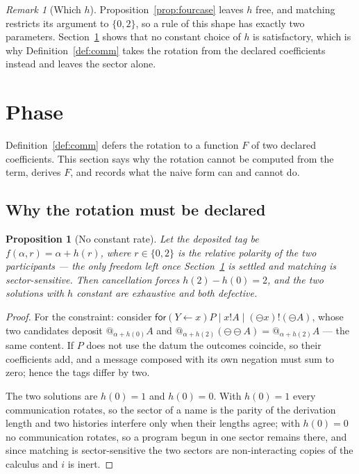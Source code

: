 \documentclass[11pt]{article}
\makeatletter
\newtheorem{proposition}[theorem]{Proposition}
\theoremstyle{definition}
\theoremstyle{remark}
\newtheorem{remark}[theorem]{Remark}
\newcommand{\quo}[1]{\ensuremath{@_{#1}}}
\newcommand{\negop}{\ensuremath{\ominus}}
\makeatother
\begin{document}
\begin{remark}[Which $h$]
\label{sec:fourcase}
Proposition~\ref{prop:fourcase} leaves $h$ free, and matching restricts its
argument to $\{0,2\}$, so a rule of this shape has exactly two parameters.
Section~\ref{sec:phase} shows that no constant choice of $h$ is satisfactory,
which is why Definition~\ref{def:comm} takes the rotation from the declared
coefficients instead and leaves the sector alone.
\end{remark}

\section{Phase}
\label{sec:phase}

Definition~\ref{def:comm} defers the rotation to a function $F$ of two declared
coefficients. This section says why the rotation cannot be computed from the
term, derives $F$, and records what the naive form can and cannot do.

\subsection{Why the rotation must be declared}

\begin{proposition}[No constant rate]
\label{prop:noconstant}
Let the deposited tag be $f(\alpha,r) = \alpha + h(r)$, where $r \in \{0,2\}$ is
the relative polarity of the two participants --- the only freedom left once
Section~\ref{sec:fourcase} is settled and matching is sector-sensitive. Then
cancellation forces $h(2)-h(0) = 2$, and the two solutions with $h$ constant are
exhaustive and both defective.
\end{proposition}

\begin{proof}
For the constraint: consider $\mathsf{for}(Y \leftarrow x)P \mid x!A \mid
(\negop x)!(\negop A)$, whose two candidates deposit
$\quo{\alpha+h(0)}A$ and $\quo{\alpha+h(2)}(\negop\negop A) =
\quo{\alpha+h(2)}A$ --- the same content. If $P$ does not use the datum the
outcomes coincide, so their coefficients add, and a message composed with its own
negation must sum to zero; hence the tags differ by two.

The two solutions are $h(0)=1$ and $h(0)=0$. With $h(0)=1$ every communication
rotates, so the sector of a name is the parity of the derivation length and two
histories interfere only when their lengths agree; with $h(0)=0$ no
communication rotates, so a program begun in one sector remains there, and since
matching is sector-sensitive the two sectors are non-interacting copies of the
calculus and $i$ is inert.
\end{proof}
\end{document}
